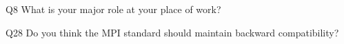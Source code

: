\begin{description}%
\item{Q8} What is your major role at your place of work?%
\item{Q28} Do you think the MPI standard should maintain backward compatibility?%
\end{description}%
